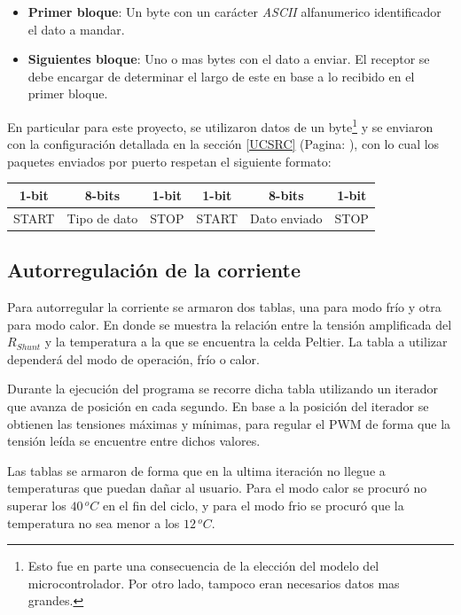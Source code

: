 \documentclass[10pt,spanish,a4paper,openany,notitlepage]{article}
\begin{document}
\begin{itemize}
\item \textbf{Primer bloque}: Un byte con un carácter \textit{ASCII} alfanumerico identificador el dato a mandar.
\item \textbf{Siguientes bloque}: Uno o mas bytes con el dato a enviar. El receptor se debe encargar de determinar el largo de este en base a lo recibido en el primer bloque.
\end{itemize}

En particular para este proyecto, se utilizaron datos de un byte\footnote{Esto fue en parte una consecuencia de la elección del modelo del microcontrolador. Por otro lado, tampoco eran necesarios datos mas grandes.} y se enviaron con la configuración detallada en la sección \ref{UCSRC} (Pagina: \pageref{UCSRC}), con lo cual los paquetes enviados por puerto respetan el siguiente formato:

\begin{center}
\begin{tabular}{|c|c|c|c|c|c|}\hline
1-bit&8-bits&1-bit&1-bit&8-bits&1-bit\\\hline
START&Tipo de dato&STOP&START&Dato enviado&STOP\\\hline
\end{tabular}
\end{center}

\subsection{Autorregulación de la corriente}

Para autorregular la corriente se armaron dos tablas, una para modo frío
y otra para modo calor. En donde se muestra la relación entre la tensión
amplificada del $R_{Shunt}$ y la temperatura a la que se encuentra la celda Peltier.
La tabla a utilizar dependerá del modo de operación, frío o calor.

Durante la ejecución del programa se recorre dicha tabla utilizando un iterador
que avanza de posición en cada segundo. En base a la posición del iterador
se obtienen las tensiones máximas y mínimas, para regular el PWM de forma
que la tensión leída se encuentre entre dichos valores.

Las tablas se armaron de forma que en la ultima iteración no llegue a temperaturas
que puedan dañar al usuario. Para el modo calor se procuró no superar los
$40\, \unit{^oC}$ en el fin del ciclo, y para el modo frio se procuró que
la temperatura no sea menor a los $12\, \unit{^oC}$.
\end{document}
